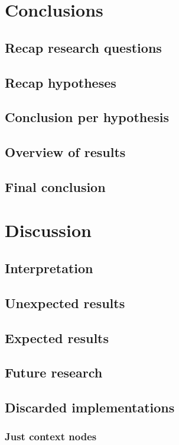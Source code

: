 \documentclass{article}
\begin{document}
 \newpage
 \section{Conclusions}
 \subsection{Recap research questions}
 \subsection{Recap hypotheses}
 \subsection{Conclusion per hypothesis}
 \subsection{Overview of results}
 \subsection{Final conclusion}
 
 \newpage
 \section{Discussion}
 \subsection{Interpretation}
 \subsection{Unexpected results}
 \subsection{Expected results}
 \subsection{Future research}
 \subsection{Discarded implementations} %

  \subsubsection{Just context nodes} %
  
\end{document}
